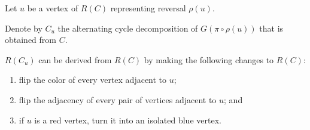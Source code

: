 \documentclass{beamer}
\theoremstyle{definition}
\begin{document}
\begin{frame}

Let $u$ be a vertex of $R(C)$ representing reversal $\rho(u)$.\pause

\begin{definition}
Denote by $C_u$ the alternating cycle decomposition of $G(\pi \circ \rho(u))$ that is obtained from $C$.%
\end{definition}\pause

\begin{lemma}
\label{lem:5}
$R(C_u)$ can be derived from $R(C)$ by making the following changes to $R(C)$:\pause
\begin{enumerate}
    \item flip the color of every vertex adjacent to $u$\pause;
    \item flip the adjacency of every pair of vertices adjacent to $u$\pause; and
    \item if $u$ is a red vertex, turn it into an isolated blue vertex.
\end{enumerate}
\end{lemma}

\end{frame}
\end{document}
